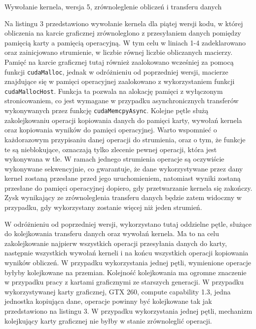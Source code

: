 \documentclass[12pt,a4paper]{article}
\begin{document}
\begin{listing}[H]
\inputminted{cuda}{listings/invocation_async.cu}
\caption{Wywołanie kernela, wersja 5, zrównoleglenie obliczeń i transferu danych}
\label{lst:async}
\end{listing}

Na listingu 3 przedstawiono wywołanie kernela dla piątej wersji kodu, w której obliczenia na karcie graficznej zrównoleglono z przesyłaniem danych pomiędzy pamięcią karty a pamięcią operacyjną. W tym celu w liniach 1-4 zadeklarowano oraz zainicjowano strumienie, w liczbie równej liczbie obliczanych macierzy. Pamięć na karcie graficznej tutaj również zaalokowano wcześniej za pomocą funkcji \verb|cudaMalloc|, jednak w odróżnieniu od poprzedniej wersji, macierze znajdujące się w pamięci operacyjnej zaalokowano z wykorzystaniem funkcji \verb|cudaMallocHost|. Funkcja ta pozwala na alokację pamięci z wyłączonym stronicowaniem, co jest wymagane w przypadku asynchronicznych transferów wykonywanych przez funkcję \verb|cudaMemcpyAsync|. Kolejne pętle służą zakolejkowaniu operacji kopiowania danych do pamięci karty, wywołań kernela oraz kopiowania wyników do pamięci operacyjnej. Warto wspomnieć o każdorazowym przypisaniu danej operacji do strumienia, oraz o tym, że funkcje te są nieblokujące, oznaczają tylko zlecenie pewnej operacji, która jest wykonywana w tle. W ramach jednego strumienia operacje są oczywiście wykonywane sekwencyjnie, co gwarantuje, że dane wykorzystywane przez dany kernel zostaną przesłane przed jego uruchomieniem, natomiast wyniki zostaną przesłane do pamięci operacyjnej dopiero, gdy przetwarzanie kernela się zakończy. Zysk wynikający ze zrównoleglenia transferu danych będzie zatem widoczny w przypadku, gdy wykorzystany zostanie więcej niż jeden strumień.

W odróżnieniu od poprzedniej wersji, wykorzystano tutaj oddzielne pętle, służące do kolejkowania transferu danych oraz wywołań kernela. Ma to na celu zakolejkowanie najpierw wszystkich operacji przesyłania danych do karty, następnie wszystkich wywołań kerneli i na końcu wszystkich operacji kopiowania wyników obliczeń. W przypadku wykorzystania jednej pętli, wymienione operacje byłyby kolejkowane na przemian. Kolejność kolejkowania ma ogromne znaczenie w przypadku pracy z kartami graficznymi ze starszych generacji. W przypadku wykorzystywanej karty graficznej, GTX 260, compute capability 1.3, jedna jednostka kopiująca dane, operacje powinny być kolejkowane tak jak przedstawiono na listingu 3. W przypadku wykorzystania jednej pętli, mechanizm kolejkujący karty graficznej nie byłby w stanie zrównoleglić operacji.
\end{document}
